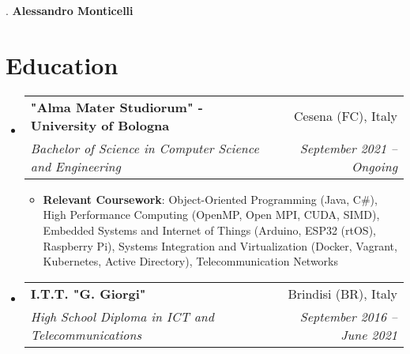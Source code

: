 \documentclass[letterpaper,11pt]{article}
\makeatletter
\newcommand{\resumeItem}[2]{
  \item\small{
    \textbf{#1}{: #2 \vspace{-2pt}}
  }
}
\newcommand{\resumeSubheading}[4]{
  \vspace{-1pt}\item
    \begin{tabular*}{0.97\textwidth}{l@{\extracolsep{\fill}}r}
      \textbf{#1} & #2 \\
      \textit{\small#3} & \textit{\small #4} \\
    \end{tabular*}\vspace{-5pt}
}
\newcommand{\resumeSubHeadingListStart}{\begin{itemize}[leftmargin=*]}
\newcommand{\resumeSubHeadingListEnd}{\end{itemize}}
\newcommand{\resumeItemListStart}{\begin{itemize}}
\newcommand{\resumeItemListEnd}{\end{itemize}\vspace{-5pt}}
\makeatother
\begin{document}
\setlength{\footskip}{5pt}.
\centering\textbf{\Large Alessandro Monticelli} \\
  \vspace{0.25in}


\section{Education}
  \resumeSubHeadingListStart
    \resumeSubheading
      {"Alma Mater Studiorum" - University of Bologna}{Cesena (FC), Italy}
      {Bachelor of Science in Computer Science and Engineering}{September 2021 -- Ongoing}
      \resumeItemListStart
          \resumeItem{Relevant Coursework}{Object-Oriented Programming (Java, C\#), High Performance Computing (OpenMP, Open MPI, CUDA, SIMD), 
          Embedded Systems and Internet of Things (Arduino, ESP32 (rtOS), Raspberry Pi), Systems Integration and Virtualization (Docker, Vagrant, Kubernetes, Active Directory), Telecommunication Networks}
      \resumeItemListEnd
    \resumeSubheading
      {I.T.T. "G. Giorgi"}{Brindisi (BR), Italy}
      {High School Diploma in ICT and Telecommunications}{September 2016 -- June 2021}
  \resumeSubHeadingListEnd

\end{document}
